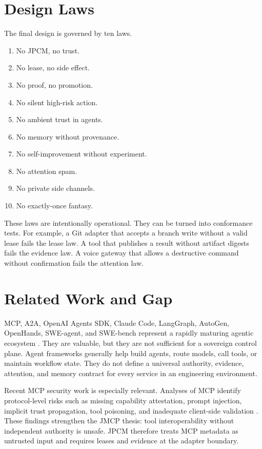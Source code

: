 \documentclass[10pt,journal,onecolumn]{IEEEtran}
\begin{document}
\section{Design Laws}
The final design is governed by ten laws.
\begin{enumerate}
\item No JPCM, no trust.
\item No lease, no side effect.
\item No proof, no promotion.
\item No silent high-risk action.
\item No ambient trust in agents.
\item No memory without provenance.
\item No self-improvement without experiment.
\item No attention spam.
\item No private side channels.
\item No exactly-once fantasy.
\end{enumerate}
These laws are intentionally operational. They can be turned into conformance tests. For example, a Git adapter that accepts a branch write without a valid lease fails the lease law. A tool that publishes a result without artifact digests fails the evidence law. A voice gateway that allows a destructive command without confirmation fails the attention law.

\section{Related Work and Gap}
MCP, A2A, OpenAI Agents SDK, Claude Code, LangGraph, AutoGen, OpenHands, SWE-agent, and SWE-bench represent a rapidly maturing agentic ecosystem \cite{mcp,a2a,openaiagents,openaicodex,claudecode,langgraph,autogen,openhands,sweagent,swebench}. They are valuable, but they are not sufficient for a sovereign control plane. Agent frameworks generally help build agents, route models, call tools, or maintain workflow state. They do not define a universal authority, evidence, attention, and memory contract for every service in an engineering environment.

Recent MCP security work is especially relevant. Analyses of MCP identify protocol-level risks such as missing capability attestation, prompt injection, implicit trust propagation, tool poisoning, and inadequate client-side validation \cite{mcpbreak,smcp,mcptm}. These findings strengthen the JMCP thesis: tool interoperability without independent authority is unsafe. JPCM therefore treats MCP metadata as untrusted input and requires leases and evidence at the adapter boundary.
\end{document}

